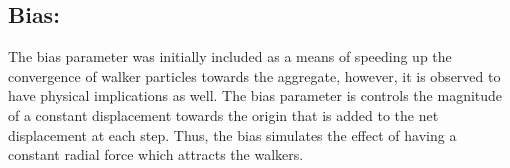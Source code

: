 \documentclass{article}
\begin{document}

\begin{appendix}

\appendixpage

\section{Bias: \label{bias}}

	The bias parameter was initially included as a means of speeding up the convergence of walker particles towards the aggregate, however, it is observed to have physical implications as well. The bias parameter is controls the magnitude of a constant displacement towards the origin that is added to the net displacement at each step. Thus, the bias simulates the effect of having a constant radial force which attracts the walkers. 
	

\end{appendix}
\end{document}
